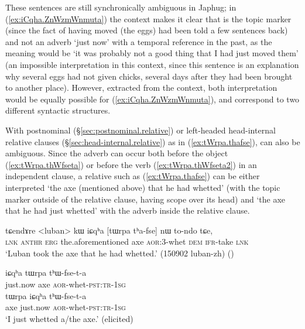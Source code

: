  These sentences are still synchronically ambiguous in Japhug; in  (\ref{ex:iCqha.ZnWzmWnmuta}) the context makes it clear that  is the topic marker (since the fact of having moved (the eggs) had been told a few sentences back) and not an adverb `just now' with a temporal reference in the past, as the meaning would be `it was probably not a good thing that I had just moved them' (an impossible interpretation in this context, since this sentence is an explanation why several eggs had not given chicks, several days after they had been brought to another place). However, extracted from the context, both interpretation would be equally possible for (\ref{ex:iCqha.ZnWzmWnmuta}), and correspond to two different syntactic structures.

With postnominal (§\ref{sec:postnominal.relative}) or left-headed head-internal relative clauses (§\ref{sec:head-internal.relative}) as in (\ref{ex:tWrpa.thafse}),  can also be ambiguous. Since the adverb  can occur both before the object (\ref{ex:tWrpa.thWfseta}) or before the verb (\ref{ex:tWrpa.thWfseta2}) in an independent clause, a relative such as (\ref{ex:tWrpa.thafse}) can be either interpreted `the axe (mentioned above) that he had whetted' (with the topic marker  outside of the relative clause, having scope over its head) and `the axe that he had just whetted' with the adverb  inside the relative clause.

 \begin{exe}
\ex \label{ex:tWrpa.thafse}
 \gll  tɕendɤre <luban> kɯ iɕqʰa [tɯrpa tʰa-fse] nɯ to-ndo tɕe, \\
 \textsc{lnk}  \textsc{anthr} \textsc{erg} the.aforementioned axe \textsc{aor}:3\flobv{}-whet \textsc{dem} \textsc{ifr}-take \textsc{lnk} \\
 \glt `Luban took the axe that he had whetted.' (150902 luban-zh)
()
 \end{exe}

  \begin{exe}
  \ex 
  \begin{xlist}
\ex \label{ex:tWrpa.thWfseta}
 \gll   iɕqʰa tɯrpa tʰɯ-fse-t-a \\
just.now axe \textsc{aor}-whet-\textsc{pst}:\textsc{tr}-\textsc{1sg} \\
\ex \label{ex:tWrpa.thWfseta2}
 \gll   tɯrpa  iɕqʰa tʰɯ-fse-t-a \\
 axe just.now \textsc{aor}-whet-\textsc{pst}:\textsc{tr}-\textsc{1sg} \\
 \glt `I just whetted a/the axe.' (elicited)
 \end{xlist}
 \end{exe}

